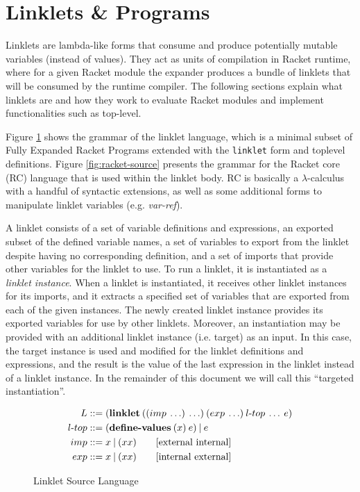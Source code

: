 \documentclass[sigplan,screen,anonymous]{acmart}
\def\dash {\text{-}}
\begin{document}
\section{Linklets \& Programs}

Linklets are lambda-like forms that consume and produce potentially
mutable variables (instead of values). They act as units of
compilation in Racket runtime, where for a given Racket module the
expander produces a bundle of linklets that will be consumed by the
runtime compiler. The following sections explain what linklets are and
how they work to evaluate Racket modules and implement functionalities
such as top-level.

Figure \ref{fig:linklet-source} shows the grammar of the linklet
language, which is a minimal subset of Fully Expanded Racket Programs
extended with the \verb|linklet| form and toplevel definitions. Figure
\ref{fig:racket-source} presents the grammar for the Racket core (RC)
language that is used within the linklet body. RC is basically a
$\lambda$-calculus with a handful of syntactic extensions, as well as some
additional forms to manipulate linklet variables
(e.g. \textit{var-ref}).

A linklet consists of a set of variable definitions and expressions,
an exported subset of the defined variable names, a set of variables
to export from the linklet despite having no corresponding definition,
and a set of imports that provide other variables for the linklet to
use. To run a linklet, it is instantiated as a {\it linklet
  instance}. When a linklet is instantiated, it receives other linklet
instances for its imports, and it extracts a specified set of
variables that are exported from each of the given instances. The
newly created linklet instance provides its exported variables for use
by other linklets. Moreover, an instantiation may be provided with an
additional linklet instance (i.e. target) as an input. In this case,
the target instance is used and modified for the linklet definitions
and expressions, and the result is the value of the last expression in
the linklet instead of a linklet instance. In the remainder of this
document we will call this ``targeted instantiation''.

\begin{figure}[tbp]
  \begin{align*}
    L  &::= (\textbf{linklet}\:((imp\: \ldots)\: \ldots)\:(exp\: \ldots)\:l\dash top\:\ldots\:e)\\
    l\dash top &::= (\textbf{define\dash values}\:(x)\:e)\:|\:e \\
    imp &::= x\:|\:(x x) \tag*{[external internal]}\\
    exp &::= x\:|\:(x x) \tag*{[internal external]}
  \end{align*}
  \caption{Linklet Source Language}
  \label{fig:linklet-source}
\end{figure}
\end{document}
